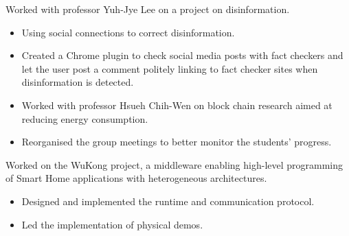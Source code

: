 \documentclass[10pt,a4paper]{../altacv}
\begin{document}
\medskip




\medskip\medskip{}

Worked with professor Yuh-Jye Lee on a project on disinformation.

\medskip

\begin{itemize}
	\item Using social connections to correct disinformation.
	\item Created a Chrome plugin to check social media posts with fact checkers and let the user post a comment politely linking to fact checker sites when disinformation is detected.
\end{itemize}

\medskip



\newpage
{\marginpar{\vspace*{\dimexpr1pt-\baselineskip}\raggedright}}

\begin{itemize}
	\item Worked with professor Hsueh Chih-Wen on block chain research aimed at reducing energy consumption.
	\item Reorganised the group meetings to better monitor the students' progress.
\end{itemize}

\medskip



\medskip\medskip{}

Worked on the WuKong project, a middleware enabling high-level programming of Smart Home applications with heterogeneous architectures.

\begin{itemize}
	\item Designed and implemented the runtime and communication protocol.
	\item Led the implementation of physical demos.
\end{itemize}
\end{document}
